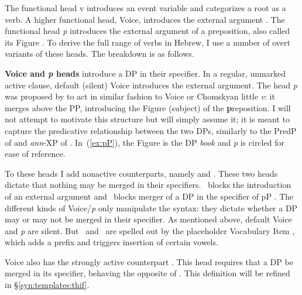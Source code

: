 The functional head v introduces an event variable and categorizes a root as a verb. A higher functional head, Voice, introduces the external argument \citep{kratzer96,pylkkanen08,marantz13lingua}. The functional head \emph{p} introduces the external argument of a preposition, also called its Figure \citep{svenonius03,svenonius07,wood14nllt}. To derive the full range of verbs in Hebrew, I use a number of overt variants of these heads. The breakdown is as follows.

\textbf{Voice and \emph{p} heads} introduce a DP in their specifier. In a regular, unmarked active clause, default (silent) Voice introduces the external argument. The head \emph{p} was proposed by \cite{svenonius03,svenonius07} to act in similar fashion to Voice or Chomskyan little \textit{v}: it merges above the PP, introducing the Figure (subject) of the \textbf{p}reposition. I will not attempt to motivate this structure but will simply assume it; it is meant to capture the predicative relationship between the two DPs, similarly to the PredP of \cite{bowers93,bowers01} and \emph{ann}-XP of \cite{mccloskey14}. In~(\ref{ex:pP}), the Figure is the DP \emph{book} and \emph{p} is circled for ease of reference.
\ex \label{ex:pP}
\xe

To these heads I add nonactive counterparts, namely \textbf{\vz} and \textbf{\pz}. These two heads dictate that nothing may be merged in their specifiers. \vz~blocks the introduction of an external argument \citep{doron03,alexiadoudoron12,bruening13,wood15springer,spathasetal15} and \pz~blocks merger of a DP in the specifier of pP \citep{wood15springer}. The different kinds of Voice/\emph{p} only manipulate the syntax: they dictate whether a DP may or may not be merged in their specifier. As mentioned above, default Voice and \emph{p} are silent. But \vz~and \pz~are spelled out by the placeholder Vocabulary Item , which adds a prefix and triggers insertion of certain vowels.

Voice also has the strongly active counterpart \textbf{\vd}. This head requires that a DP be merged in its specifier, behaving the opposite of \vz. This definition will be refined in \S\ref{syn:templates:thif}.

